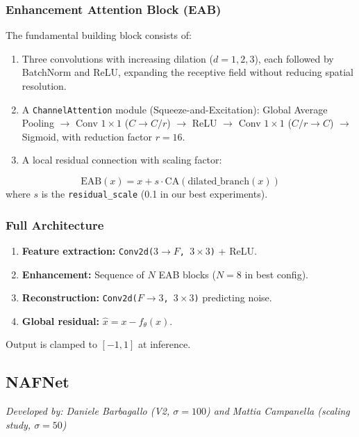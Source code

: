 \subsubsection{Enhancement Attention Block (EAB)}
The fundamental building block consists of:
\begin{enumerate}
    \item Three convolutions with increasing dilation ($d = 1, 2, 3$), each followed by BatchNorm and ReLU, expanding the receptive field without reducing spatial resolution.
    \item A \texttt{Channel\-Attention} module (Squeeze-and-Excitation): Global Average Pooling $\to$ Conv $1\!\times\!1$ ($C \!\to\! C/r$) $\to$ ReLU $\to$ Conv $1\!\times\!1$ ($C/r \!\to\! C$) $\to$ Sigmoid, with reduction factor $r = 16$.
    \item A local residual connection with scaling factor:
\end{enumerate}
\begin{equation}
\text{EAB}(x) = x + s \cdot \text{CA}(\text{dilated\_branch}(x))
\end{equation}
where $s$ is the \texttt{residual\_scale} (0.1 in our best experiments).

\subsubsection{Full Architecture}
\begin{enumerate}
    \item \textbf{Feature extraction:} \texttt{Conv2d($3 \!\to\! F$, $3\!\times\!3$)} + ReLU.
    \item \textbf{Enhancement:} Sequence of $N$ EAB blocks ($N = 8$ in best config).
    \item \textbf{Reconstruction:} \texttt{Conv2d($F \!\to\! 3$, $3\!\times\!3$)} predicting noise.
    \item \textbf{Global residual:} $\hat{x} = x - f_\theta(x)$.
\end{enumerate}
Output is clamped to $[-1, 1]$ at inference.

\subsection{NAFNet}
\label{subsec:nafnet}

\textit{Developed by: Daniele Barbagallo (V2, $\sigma\!=\!100$) and Mattia Campanella (scaling study, $\sigma\!=\!50$)}

